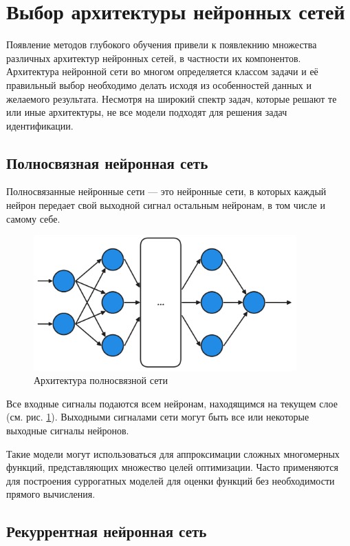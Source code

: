 \section{Выбор архитектуры нейронных сетей}

Появление методов глубокого обучения привели к появлекнию множества различных
архитектур нейронных сетей, в частности их компонентов. Архитектура нейронной
сети во многом определяется классом задачи и её правильный выбор необходимо
делать исходя из особенностей данных и желаемого результата. Несмотря на широкий
спектр задач, которые решают те или иные архитектуры, не все модели подходят для
решения задач идентификации.

\subsection{Полносвязная нейронная сеть}

Полносвязанные нейронные сети — это нейронные сети, в которых каждый нейрон
передает свой выходной сигнал остальным нейронам, в том числе и самому себе. 

\begin{figure}[H]
  \centering
    \includegraphics[width=0.9\textwidth]{figures/arch_fully_connected.png}
  \caption{Архитектура полносвязной сети}\label{fig:dense_nn}
\end{figure}

Все входные сигналы подаются всем нейронам, находящимся на текущем слое (см.
рис. \ref{fig:dense_nn}). Выходными сигналами сети могут быть все или некоторые
выходные сигналы нейронов.

Такие модели могут использоваться для аппроксимации сложных многомерных функций,
представляющих множество целей оптимизации. Часто применяются для построения
суррогатных моделей для оценки функций без необходимости прямого вычисления.

\subsection{Рекуррентная нейронная сеть}

